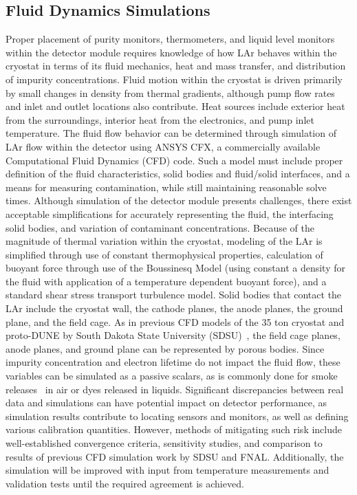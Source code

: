 \subsection{Fluid Dynamics Simulations}
\label{sec:fdsp-slow-cryo-cfd}
Proper placement of purity monitors, thermometers, and liquid level monitors within the detector module requires knowledge of how LAr behaves within the cryostat in terms of its fluid mechanics, heat and mass transfer, and distribution of impurity concentrations. 
Fluid motion within the cryostat is driven primarily by small changes in density from thermal gradients, although pump flow rates and inlet and outlet locations also contribute. 
Heat sources include exterior heat from the surroundings, interior heat from the electronics, and pump inlet temperature. 
The fluid flow behavior can be determined through simulation of LAr flow within the detector using ANSYS CFX, a commercially available Computational Fluid Dynamics (CFD) code. Such a model must include proper definition of the fluid characteristics, solid bodies and fluid/solid interfaces, and a means for measuring contamination, while still maintaining reasonable solve times.
Although simulation of the detector module presents challenges, there exist acceptable simplifications for accurately representing the fluid, the interfacing solid bodies, and variation of contaminant concentrations. Because of the magnitude of thermal variation within the cryostat, modeling of the LAr is simplified through use of constant thermophysical properties, calculation of buoyant force through use of the Boussinesq Model (using constant a density for the fluid with application of a temperature dependent buoyant force), and a standard shear stress transport turbulence model. Solid bodies that contact the LAr include the cryostat wall, the cathode planes, the anode planes, the ground plane, and the field cage. As in previous CFD models of the 35 ton cryostat and proto-DUNE by South Dakota State University (SDSU)~\cite{docdb-5915}, the field cage planes, anode planes, and ground plane can be represented by porous bodies. Since impurity concentration and electron lifetime do not impact the fluid flow, these variables can be simulated as a passive scalars, as is commonly done for smoke releases~\cite{cfd-1} in air or dyes released in liquids.
Significant discrepancies between real data and simulations can have potential impact on detector performance, as simulation results contribute to locating sensors and monitors, as well as defining various calibration quantities. However, methods of mitigating such risk include well-established convergence criteria, sensitivity studies, and comparison to results of previous CFD simulation work by SDSU and FNAL. Additionally, the simulation will be improved with input from temperature measurements and validation tests until the required agreement is achieved.


  
